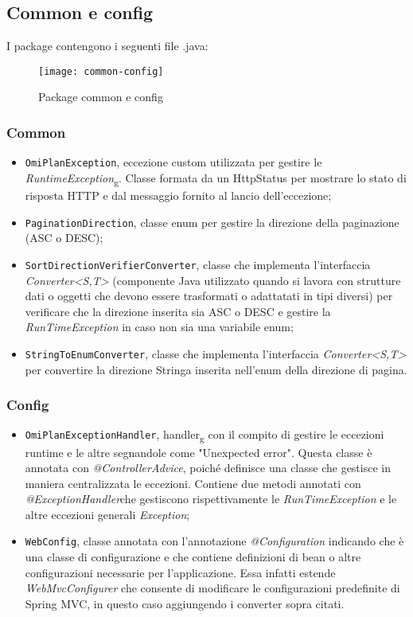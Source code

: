 \subsection{Common e config}
I package contengono i seguenti file .java:

\begin{figure}[H] 
    \centering 
    \texttt{[image: common-config]} 
    \caption{Package common e config}
\end{figure}
\subsubsection*{Common}
\begin{itemize}
\item \texttt{OmiPlanException}, eccezione custom utilizzata per gestire le \textit{RuntimeException}\textsubscript{g}. Classe formata da un HttpStatus per mostrare lo stato di risposta HTTP e dal messaggio fornito al lancio dell'eccezione;
\item \texttt{PaginationDirection}, classe enum per gestire la direzione della paginazione (ASC o DESC);
\item \texttt{SortDirectionVerifierConverter}, classe che implementa l'interfaccia \textit{Converter<S,T>} (componente Java utilizzato quando si lavora con strutture dati o oggetti che devono essere trasformati o adattatati in tipi diversi) per verificare che la direzione inserita sia ASC o DESC e gestire la \textit{RunTimeException} in caso non sia una variabile enum;
\item \texttt{StringToEnumConverter}, classe che implementa l'interfaccia \textit{Converter<S,T>} per convertire la direzione Stringa inserita nell'enum della direzione di pagina.
\end{itemize}

\subsubsection*{Config}
\begin{itemize}
\item \texttt{OmiPlanExceptionHandler}, handler\textsubscript{g} con il compito di gestire le eccezioni runtime e le altre segnandole come "Unexpected error". Questa classe è annotata con \textit{@ControllerAdvice}, poiché definisce una classe che gestisce in maniera centralizzata le eccezioni. Contiene due metodi annotati con \textit{@ExceptionHandler}che gestiscono rispettivamente le \textit{RunTimeException} e le altre eccezioni generali \textit{Exception};
\item \texttt{WebConfig}, classe annotata con l'annotazione \textit{@Configuration} indicando che è una classe di configurazione e che contiene definizioni di bean o altre configurazioni necessarie per l'applicazione. Essa infatti estende \textit{WebMvcConfigurer} che consente di modificare le configurazioni predefinite di Spring MVC, in questo caso aggiungendo i converter sopra citati.
\end{itemize}